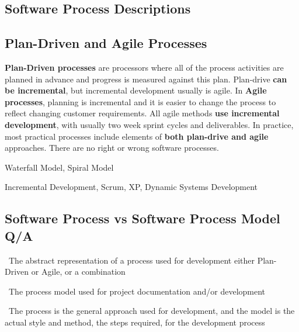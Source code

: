 \documentclass{article}
\begin{document}
\subsection{Software Process Descriptions}

\subsection{Plan-Driven and Agile Processes}
\vspace{-6pt}
\textbf{Plan-Driven processes} are processors where all of the process activities are planned in advance and progress is measured against this plan. Plan-drive \textbf{can be incremental}, but incremental development usually is agile. In \textbf{Agile processes}, planning is incremental and it is easier to change the process to reflect changing customer requirements. All agile methods \textbf{use incremental development}, with usually two week sprint cycles and deliverables. In practice, most practical processes include elements of \textbf{both plan-drive and agile} approaches. There are no right or wrong software processes.
\vspace{-8pt}
\begin{description}
  \setlength\itemsep{-.25em}
  \item [Plan-Driven:] Waterfall Model, Spiral Model
  \item [Agile:] Incremental Development, Scrum, XP, Dynamic Systems Development
\end{description}


\subsection{Software Process vs Software Process Model Q/A}
\vspace{-6pt}
\begin{description}
  \setlength\itemsep{-.25em}
  \item [What is a software process?] \ \newline The abstract representation of a process used for development either Plan-Driven or Agile, or a combination
  \item [What is a software process model?] \ \newline The process model used for project documentation and/or development
  \item [What is the difference?] \ \newline The process is the general approach used for development, and the model is the actual style and method, the steps required, for the development process
\end{description}
\end{document}
